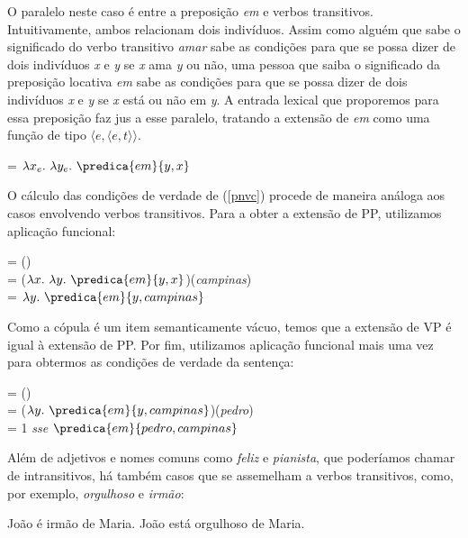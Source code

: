 \n O paralelo neste caso é entre a preposição \textit{em} e verbos
transitivos. Intuitivamente, ambos relacionam dois indivíduos.
Assim como alguém que sabe o significado do verbo transitivo
\textit{amar} sabe as condições para que se possa dizer de dois
indivíduos \textit{x} e \textit{y} se \textit{x} ama \textit{y} ou não,
uma pessoa que saiba o significado da preposição locativa \textit{em}
sabe as condições para que se possa dizer de dois indivíduos
\textit{x} e \textit{y} se \textit{x} está ou não em \textit{y}. A
entrada lexical que proporemos para essa preposição faz jus a
esse paralelo, tratando a extensão de \textit{em} como uma função de
tipo $\langle e, \langle e,t\rangle\rangle$.

\begin{exe}
	\ex {} = $\lambda x_{e}.\ \lambda y_{e}.\ \predica{em}{y,x}$
\end{exe}

\n O cálculo das condições de verdade de (\ref{pnvc}) procede
de maneira análoga aos casos envolvendo verbos transitivos. Para a
obter a extensão de PP, utilizamos aplicação funcional:

\begin{exe}
	\ex {} = ()\\
		 = ($\lambda x.\ \lambda y.\ \predica{em}{y,x}$)(\textit{campinas})\\
		 = $\lambda y.\ \predica{em}{y,campinas}$
\end{exe}

\n Como a cópula é um item semanticamente vácuo, temos que a
extensão de VP é igual à extensão de PP. Por fim, utilizamos
aplicação funcional mais uma vez para obtermos as condições
de verdade da sentença:

\begin{exe}
	\ex {} = ()\\
		 = ($\lambda y.\ \predica{em}{y,campinas}$)(\textit{pedro})\\
		 = 1 \textit{sse} $\predica{em}{pedro,campinas}$
\end{exe}

\n Além de adjetivos e nomes comuns como \textit{feliz} e \textit{pianista}, que
poderíamos chamar de intransitivos, há também casos que se
assemelham a verbos transitivos, como, por exemplo, \textit{orgulhoso} e
\textit{irmão}:

\begin{exe}
\ex\label{ptr}
\begin{xlist}
\ex João é irmão de Maria.\label{ptra}
\ex João está orgulhoso de Maria.\label{ptrb}
\end{xlist}
\end{exe}

